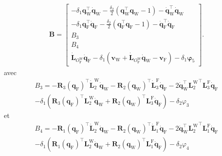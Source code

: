 \begin{align}
    \label{eq:b_contraint}
    \boldsymbol{B} = \begin{bmatrix}
            -\delta_{1} \boldsymbol{q}_{\text{W}}^\top \dot{\boldsymbol{q}}_{\text{W}} - \frac{\delta_{2}}{2} (\boldsymbol{q}_{\text{W}}^\top \boldsymbol{q}_{\text{W}} -1) - \dot{\boldsymbol{q}}_{\text{W}}^\top \dot{\boldsymbol{q}}_{\text{W}} \\
            -\delta_{1} \boldsymbol{q}_{\text{F}}^\top \dot{\boldsymbol{q}}_{\text{F}} - \frac{\delta_{2}}{2} (\boldsymbol{q}_{\text{F}}^\top \boldsymbol{q}_{\text{F}} -1) - \dot{\boldsymbol{q}}_{\text{F}}^\top \dot{\boldsymbol{q}}_{\text{F}} \\
            B_{3}\\
            B_{4}\\
            \dot{\boldsymbol{L}}_{O_{\text{F}}^{\text{W}}} \dot{\boldsymbol{q}}_{\text{F}}  - \delta_{1}( \boldsymbol{v}_{\text{W}} + \dot{\boldsymbol{L}}_{O_{\text{F}}^{\text{W}}} \dot{\boldsymbol{q}}_{\text{W}} - \boldsymbol{v}_{\text{F}}) - \delta_{1}\boldsymbol{\varphi}_{5}
        \end{bmatrix}.
\end{align}
avec 
\begin{multline*}
    B_{3} = -\boldsymbol{R}_{3}(\boldsymbol{q}_{\text{F}})^\top \dot{\boldsymbol{L}}_{2}^{\text{W}}\dot{\boldsymbol{q}}_{\text{W}} - \boldsymbol{R}_{2}(\boldsymbol{q}_{\text{W}})^\top \dot{\boldsymbol{L}}_{3}^{\text{F}} \dot{\boldsymbol{q}}_{\text{F}} - 2\dot{\boldsymbol{q}}_{\text{W}}^\top {\boldsymbol{L}_{2}^{\text{W}}}^\top \boldsymbol{L}_{3}^{\text{F}} \dot{\boldsymbol{q}}_{\text{F}}\\ - \delta_{1}(\boldsymbol{R}_{3}(\boldsymbol{q}_{\text{F}})^\top \boldsymbol{L}_{2}^{\text{W}}\dot{\boldsymbol{q}}_{\text{W}} +  \boldsymbol{R}_{2}(\boldsymbol{q}_{\text{W}})^\top \boldsymbol{L}_{3}^{\text{F}} \dot{\boldsymbol{q}}_{\text{F}} ) - \delta_{2}\varphi_{3}
\end{multline*}
et 
\begin{multline*}
    B_{4} = -\boldsymbol{R}_{1}(\boldsymbol{q}_{\text{F}})^\top \dot{\boldsymbol{L}}_{2}^{\text{W}}\dot{\boldsymbol{q}}_{\text{W}} - \boldsymbol{R}_{2}(\boldsymbol{q}_{\text{W}})^\top \dot{\boldsymbol{L}}_{1}^{\text{F}} \dot{\boldsymbol{q}}_{\text{F}} - 2\dot{\boldsymbol{q}}_{\text{W}}^\top {\boldsymbol{L}_{2}^{\text{W}}}^\top \boldsymbol{L}_{1}^{\text{F}} \dot{\boldsymbol{q}}_{\text{F}} \\- \delta_{1}(\boldsymbol{R}_{1}(\boldsymbol{q}_{\text{F}})^\top \boldsymbol{L}_{2}^{\text{W}}\dot{\boldsymbol{q}}_{\text{W}} +  \boldsymbol{R}_{2}(\boldsymbol{q}_{\text{W}})^\top \boldsymbol{L}_{1}^{\text{F}} \dot{\boldsymbol{q}}_{\text{F}} ) - \delta_{2} \varphi_{4}
\end{multline*}

